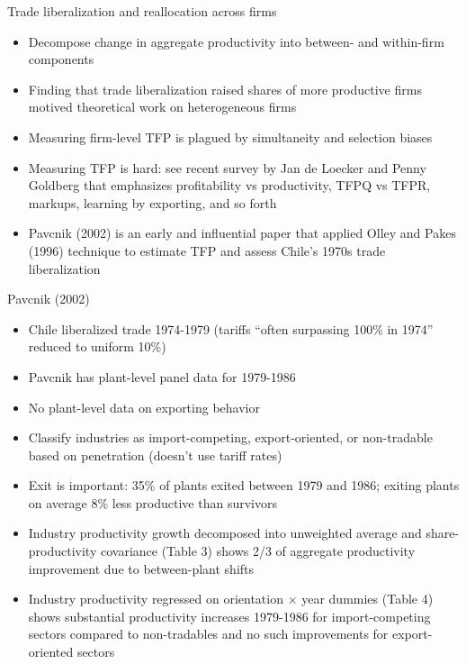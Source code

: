 \documentclass[10pt,notes=hide]{beamer}
\begin{document}
\begin{frame}{Trade liberalization and reallocation across firms}
\begin{itemize}
\item Decompose change in aggregate productivity into between- and within-firm components
\item Finding that trade liberalization raised shares of more productive firms motived theoretical work on heterogeneous firms
\item Measuring firm-level TFP is plagued by simultaneity and selection biases
\item Measuring TFP is hard: see recent survey by Jan de Loecker and Penny Goldberg that emphasizes profitability vs productivity, TFPQ vs TFPR, markups, learning by exporting, and so forth
\item Pavcnik (2002) is an early and influential paper that applied Olley and Pakes (1996) technique to estimate TFP and assess Chile's 1970s trade liberalization
\end{itemize}
\end{frame}
\begin{frame}{Pavcnik (2002)}
\begin{itemize}
\item Chile liberalized trade 1974-1979 (tariffs ``often surpassing 100\% in 1974'' reduced to uniform 10\%)
\item Pavcnik has plant-level panel data for 1979-1986
\item No plant-level data on exporting behavior
\item Classify industries as import-competing, export-oriented, or non-tradable based on penetration (doesn't use tariff rates)
\item Exit is important: 35\% of plants exited between 1979 and 1986; exiting plants on average 8\% less productive than survivors
\item Industry productivity growth decomposed into unweighted average and share-productivity covariance (Table 3) shows 2/3 of aggregate productivity improvement due to between-plant shifts
\item Industry productivity regressed on orientation $\times$ year dummies (Table 4) shows substantial productivity increases 1979-1986 for import-competing sectors compared to non-tradables and no such improvements for export-oriented sectors
\end{itemize}
\end{frame}
\end{document}
